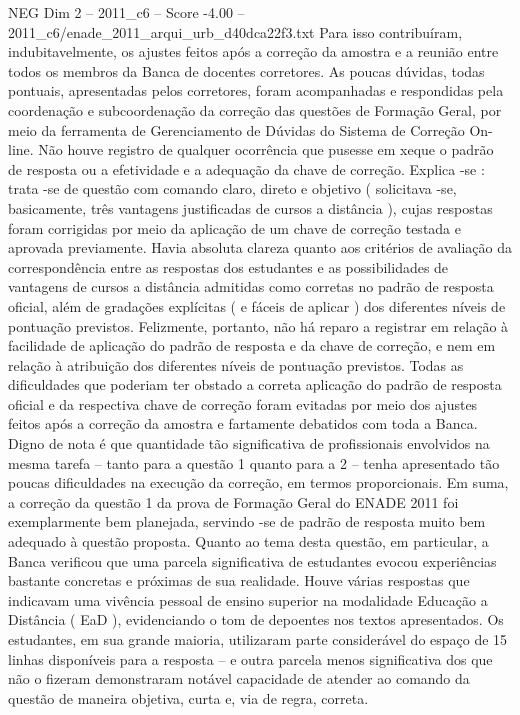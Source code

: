 \begin{textsample}{NEG Dim 2 – 2011\_c6 – Score -4.00 – 2011\_c6/enade\_2011\_arqui\_urb\_d40dca22f3.txt}
Para isso contribuíram, indubitavelmente, os ajustes feitos após a correção da amostra e a reunião entre todos os membros da Banca de docentes corretores.
As poucas dúvidas, todas pontuais, apresentadas pelos corretores, foram acompanhadas e respondidas pela coordenação e subcoordenação da correção das questões de Formação Geral, por meio da ferramenta de Gerenciamento de Dúvidas do Sistema de Correção On-line.
Não houve registro de qualquer ocorrência que pusesse em xeque o padrão de resposta ou a efetividade e a adequação da chave de correção.
Explica -se : trata -se de questão com comando claro, direto e objetivo ( solicitava -se, basicamente, três vantagens justificadas de cursos a distância ), cujas respostas foram corrigidas por meio da aplicação de um chave de correção testada e aprovada previamente.
Havia absoluta clareza quanto aos critérios de avaliação da correspondência entre as respostas dos estudantes e as possibilidades de vantagens de cursos a distância admitidas como corretas no padrão de resposta oficial, além de gradações explícitas ( e fáceis de aplicar ) dos diferentes níveis de pontuação previstos.
Felizmente, portanto, não há reparo a registrar em relação à facilidade de aplicação do padrão de resposta e da chave de correção, e nem em relação à atribuição dos diferentes níveis de pontuação previstos.
Todas as dificuldades que poderiam ter obstado a correta aplicação do padrão de resposta oficial e da respectiva chave de correção foram evitadas por meio dos ajustes feitos após a correção da amostra e fartamente debatidos com toda a Banca.
Digno de nota é que quantidade tão significativa de profissionais envolvidos na mesma tarefa – tanto para a questão 1 quanto para a 2 – tenha apresentado tão poucas dificuldades na execução da correção, em termos proporcionais.
Em suma, a correção da questão 1 da prova de Formação Geral do ENADE 2011 foi exemplarmente bem planejada, servindo -se de padrão de resposta muito bem adequado à questão proposta.
Quanto ao tema desta questão, em particular, a Banca verificou que uma parcela significativa de estudantes evocou experiências bastante concretas e próximas de sua realidade.
Houve várias respostas que indicavam uma vivência pessoal de ensino superior na modalidade Educação a Distância ( EaD ), evidenciando o tom de depoentes nos textos apresentados.
Os estudantes, em sua grande maioria, utilizaram parte considerável do espaço de 15 linhas disponíveis para a resposta – e outra parcela menos significativa dos que não o fizeram demonstraram notável capacidade de atender ao comando da questão de maneira objetiva, curta e, via de regra, correta.

\end{textsample}
